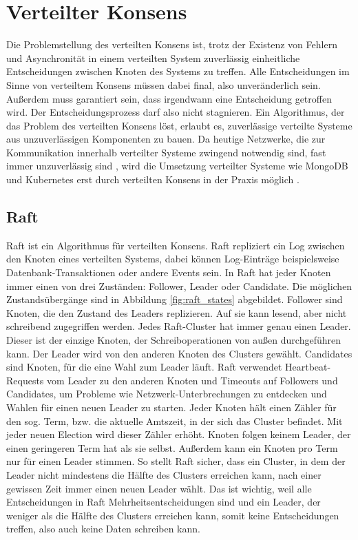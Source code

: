 \documentclass[12pt,a4paper]{report}
\begin{document}
\section{Verteilter Konsens}
\label{chap:dist_consensus}
Die Problemstellung des verteilten Konsens ist, trotz der Existenz von Fehlern und Asynchronität in einem verteilten System
zuverlässig einheitliche Entscheidungen zwischen Knoten des Systems zu treffen. Alle Entscheidungen im Sinne von verteiltem Konsens
müssen dabei final, also unveränderlich sein. Außerdem muss garantiert sein, dass irgendwann eine Entscheidung getroffen wird. Der
Entscheidungsprozess darf also nicht stagnieren. Ein Algorithmus, der das Problem des verteilten Konsens löst, erlaubt es,
zuverlässige verteilte Systeme aus unzuverlässigen Komponenten zu bauen. \cite{distributed_consensus} Da heutige Netzwerke, die
zur Kommunikation innerhalb verteilter Systeme zwingend notwendig sind, fast immer unzuverlässig sind
\cite{the_network_is_reliable}, wird die Umsetzung verteilter Systeme wie MongoDB und Kubernetes erst durch verteilten Konsens in
der Praxis möglich \cite{distributed_consensus}.

\subsection{Raft}
Raft ist ein Algorithmus für verteilten Konsens. Raft repliziert ein Log zwischen den Knoten eines verteilten Systems, dabei
können Log-Einträge beispielsweise Datenbank-Transaktionen oder andere Events sein. In Raft hat jeder Knoten immer einen von drei
Zuständen: Follower, Leader oder Candidate. Die möglichen Zustandsübergänge sind in Abbildung \ref{fig:raft_states} abgebildet.
Follower sind Knoten, die den Zustand des Leaders replizieren. Auf sie kann lesend, aber nicht schreibend zugegriffen werden.
Jedes Raft-Cluster hat immer genau einen Leader. Dieser ist der einzige Knoten, der Schreiboperationen von außen durchgeführen
kann. Der Leader wird von den anderen Knoten des Clusters gewählt. Candidates sind Knoten, für die eine Wahl zum Leader läuft.
Raft verwendet Heartbeat-Requests vom Leader zu den anderen Knoten und Timeouts auf Followers und Candidates, um Probleme wie
Netzwerk-Unterbrechungen zu entdecken und Wahlen für einen neuen Leader zu starten. Jeder Knoten hält einen Zähler für den sog.
Term, bzw. die aktuelle Amtszeit, in der sich das Cluster befindet. Mit jeder neuen Election wird dieser Zähler erhöht. Knoten
folgen keinem Leader, der einen geringeren Term hat als sie selbst. Außerdem kann ein Knoten pro Term nur für einen Leader
stimmen. So stellt Raft sicher, dass ein Cluster, in dem der Leader nicht mindestens die Hälfte des Clusters erreichen kann, nach
einer gewissen Zeit immer einen neuen Leader wählt. Das ist wichtig, weil alle Entscheidungen in Raft Mehrheitsentscheidungen sind
und ein Leader, der weniger als die Hälfte des Clusters erreichen kann, somit keine Entscheidungen treffen, also auch keine Daten
schreiben kann. \cite{raft_original_paper}
\end{document}
